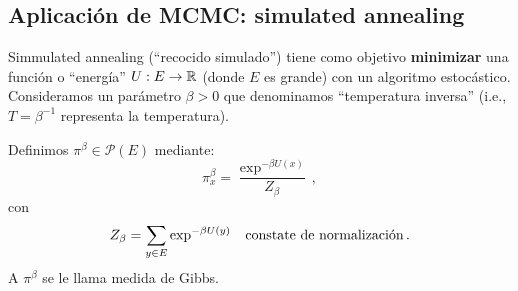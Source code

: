 \subsection{Aplicación de MCMC: simulated annealing}
Simmulated annealing (``recocido simulado'') tiene como objetivo \textbf{minimizar} una funci\'on o  ``energía'' $U:E\to\mathbb{R}$ (donde $E$ es grande) con un algoritmo estocástico.
\newp Consideramos un par\'ametro  $\beta>0$ que denominamos ``temperatura inversa'' (i.e., $T=\beta^{-1}$ representa la temperatura).
\vspace{.2cm} \\ %
\begin{definition}
Definimos $\pi^\beta\in\mathcal{P}(E)$ mediante:
$$ \pi^\beta_x = \displaystyle \frac{\exp^{-\beta U(x)}}{Z_\beta}\,,$$
con
$$ Z_\beta = \displaystyle\sum_{y\in E}\exp^{-\beta U(y)} \hspace{.25cm}\,\mbox{constate de normalización}\,.$$
A $\pi^\beta$ se le llama medida de Gibbs.
\vspace{.5cm} \\ %
\end{definition}
